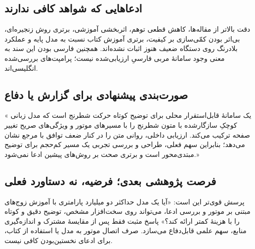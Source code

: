 \documentclass[a4paper,12pt]{article}
\newcommand{\en}[1]{\lr{#1}}
\begin{document}
\subsection*{ادعاهایی که شواهد کافی ندارند}
دقت بالاتر از مقاله‌ها، کاهش قطعی توهم، اثربخشی آموزشی، برتری روش زنجیره‌ای، بی‌اثر بودن کمّی‌سازی بر کیفیت، برتری آموزش کتاب نسبت به مدل پایه و عملکرد بلادرنگ روی دستگاه ضعیف هنوز اثبات نشده‌اند. همچنین فارسی بودن این سند به معنی وجود سامانهٔ مربی فارسیِ ارزیابی‌شده نیست؛ پرامپت‌های بررسی‌شده انگلیسی‌اند.

\subsection*{صورت‌بندی پیشنهادی برای گزارش یا دفاع}
«\en{BlunderGuard} یک سامانهٔ قابل‌استقرار محلی برای توضیح کوتاه حرکت شطرنج است که مدل زبانی کوچکِ سازگارشده با متون شطرنج را با مسیرهای موتور و ویژگی‌های صریح تغییر صفحه ترکیب می‌کند. ارزیابی داخلی، روانی متن را در کنار ضعف توافق با مرجع نشان می‌دهد؛ بنابراین سهم فعلی، طراحی و بررسی تجربی یک مسیر کم‌حجم برای توضیح مبتدی‌محور است و برتری صحت بر روش‌های پیشین ادعا نمی‌شود.»

\subsection*{فرصت پژوهشی بعدی؛ فرضیه، نه دستاورد فعلی}
پرسش قوی‌تر این است: «آیا یک مدل حداکثر دو میلیارد پارامتری با آموزش زوج‌های مبتنی بر موتور و بررسی ادعا، می‌تواند روی سخت‌افزار مشخص، توضیح دقیق و کوتاه را با هزینهٔ کمتر ارائه کند؟» پاسخ مثبت فقط پس از مقایسهٔ مشترک و اندازه‌گیری منابع، سهم علمی قابل‌دفاع می‌سازد. صرف اتصال موتور به مدل یا استفاده از کتاب، برای ادعای نخستین‌بودن کافی نیست.

\clearpage
\end{document}

